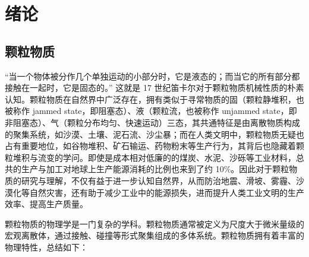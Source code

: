 
\chapter{绪论}

\section{颗粒物质}

“当一个物体被分作几个单独运动的小部分时，它是液态的；而当它的所有部分都接触在一起时，它是固态的。” 这就是 17 世纪笛卡尔对于颗粒物质机械性质的朴素认知。颗粒物质在自然界中广泛存在，拥有类似于寻常物质的固（颗粒静堆积，也被称作 jammed state，即阻塞态）、液（颗粒流，也被称作 unjammed state，即非阻塞态）、气（颗粒分布均匀、快速运动）三态\cite{RevModPhys.68.1259}，其共通特征是由离散物质构成的聚集系统，如沙漠、土壤、泥石流、沙尘暴；而在人类文明中，颗粒物质无疑也占有重要地位，如谷物堆积、矿石输运、药物粉末等生产行为，其背后也隐藏着颗粒堆积与流变的学问。即使是成本相对低廉的的煤炭、水泥、沙砾等工业材料，总共的生产与加工对地球上生产能源消耗的比例也来到了约 \num{10}\%\cite{duran2000sands}。因此对于颗粒物质的研究与理解，不仅有益于进一步认知自然界，从而防治地震、滑坡、雾霾、沙漠化等自然灾害，还有助于减少工业中的能源损失，进而提升人类工业文明的生产效率、提高生产质量。

颗粒物质的物理学是一门复杂的学科。颗粒物质通常被定义为尺度大于微米量级的宏观离散体，通过接触、碰撞等形式聚集组成的多体系统。颗粒物质拥有着丰富的物理特性，总结如下：

